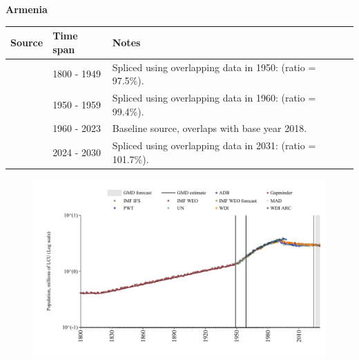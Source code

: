 \documentclass[12pt,a4paper,landscape]{article}
\begin{document}
\begin{adjustbox}{max totalsize={\paperwidth}{\paperheight},center}
\begin{minipage}[t][\textheight][t]{\textwidth}
\vspace*{0.5cm}
{}
\begin{center}
{\Large\bfseries Armenia}
\end{center}
\vspace{0.5cm}
\begin{table}[H]
\centering
\small
\begin{tabular}{|l|l|l|}
\hline
\textbf{Source} & \textbf{Time span} & \textbf{Notes} \\
\hline
\rowcolor{white}\cite{Gapminder}& 1800 - 1949 &Spliced using overlapping data in 1950: (ratio = 97.5\%).\\
\rowcolor{lightgray}\cite{IMF_IFS}& 1950 - 1959 &Spliced using overlapping data in 1960: (ratio = 99.4\%).\\
\rowcolor{white}\cite{WDI}& 1960 - 2023 &Baseline source, overlaps with base year 2018.\\
\rowcolor{lightgray}\cite{Gapminder}& 2024 - 2030 &Spliced using overlapping data in 2031: (ratio = 101.7\%).\\
\hline
\end{tabular}
\end{table}
\begin{figure}[H]
\centering
\includegraphics[width=\textwidth,height=0.6\textheight,keepaspectratio]{graphs/ARM_pop.pdf}
\end{figure}
\end{minipage}
\end{adjustbox}
\end{document}
